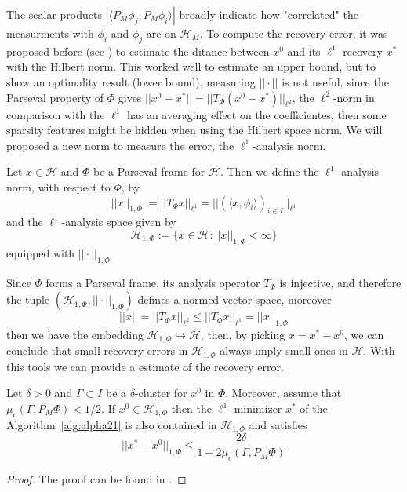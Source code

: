 The scalar products $|\langle P_M\phi_j,P_M\phi_i\rangle|$ broadly indicate how "correlated" the measurments with $\phi_i$ and $\phi_j$ are on $\mathcal{H}_M$. To compute the recovery error, it was proposed before (see \cite{Firstinpaint}) to estimate the ditance between $x^0$ and its $\ell^1$-recovery $x^*$ with the Hilbert norm. This worked well to estimate an upper bound, but to show an optimality result (lower bound), measuring $||\cdot||$ is not useful, since the Parseval property of $\Phi$ gives $||x^0-x^*||=||T_{\Phi}(x^0-x^*)||_{\ell^2}$, the $\ell^2$-norm in comparison with the $\ell^1$ has an averaging effect on the coefficientes, then some sparsity features might be hidden when using the Hilbert space norm. We will proposed a new norm to measure the error, the $\ell^1$-analysis norm.

\bigskip

\begin{defn}
Let $x\in\mathcal{H}$ and $\Phi$ be a Parseval frame for $\mathcal{H}$. Then we define the $\ell^1$-analysis norm, with respect to $\Phi$, by
$$
||x||_{1,\Phi}:=||T_{\Phi}x||_{\ell^1}=||(\langle x,\phi_i\rangle)_{i\in I}||_{\ell^1}
$$
and the $\ell^1$-analysis space given by 
$$
\mathcal{H}_{1,\Phi}:=\{x\in \mathcal{H}:||x||_{1,\Phi}<\infty\}
$$
equipped with $||\cdot||_{1,\Phi}$
\end{defn}

Since $\Phi$ forms a Parseval frame, its analysis operator $T_{\Phi}$ is injective, and therefore the tuple $(\mathcal{H}_{1,\Phi},||\cdot||_{1,\Phi})$ defines a normed vector space, moreover
\begin{equation}
\label{eq:alpha24}
||x||=||T_{\Phi}x||_{\ell^2}\leq ||T_{\Phi}x||_{\ell^1}=||x||_{1,\Phi}
\end{equation}
then we have the embedding $\mathcal{H}_{1,\Phi}\hookrightarrow\mathcal{H}$, then, by picking $x=x^*-x^0$, we can conclude that small recovery errors in $\mathcal{H}_{1,\Phi}$ always imply small ones in $\mathcal{H}$. With this tools we can provide a estimate of the recovery error.

\begin{thm}
\label{thm:alpha25}
Let $\delta>0$ and $\Gamma\subset I$ be a $\delta$-cluster for $x^0$ in $\Phi$. Moreover, assume that $\mu_c(\Gamma,P_M\Phi)<1/2$. If $x^0\in\mathcal{H}_{1,\Phi}$ then the $\ell^1$-minimizer $x^*$ of the Algorithm~\ref{alg:alpha21} is also contained in $\mathcal{H}_{1,\Phi}$ and satisfies 
\begin{equation}
\label{eq:alpha25}
||x^*-x^0||_{1,\Phi}\leq \frac{2\delta}{1-2\mu_c(\Gamma,P_M\Phi)}
\end{equation}
\end{thm}
\begin{proof}
The proof can be found in \cite{Firstinpaint}.
\end{proof}

